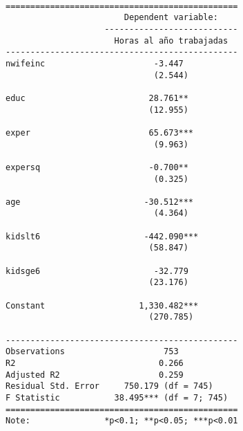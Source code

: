 \documentclass[
  letterpaper,
  DIV=11,
  numbers=noendperiod]{scrreprt}
\newenvironment{Shaded}{\begin{snugshade}}{\end{snugshade}}
\newcommand{\CommentTok}[1]{\textcolor[rgb]{0.37,0.37,0.37}{#1}}
\newcommand{\FunctionTok}[1]{\textcolor[rgb]{0.28,0.35,0.67}{#1}}
\newcommand{\NormalTok}[1]{\textcolor[rgb]{0.00,0.23,0.31}{#1}}
\newcommand{\SpecialCharTok}[1]{\textcolor[rgb]{0.37,0.37,0.37}{#1}}
\begin{document}
\begin{verbatim}

===============================================
                        Dependent variable:    
                    ---------------------------
                      Horas al año trabajadas  
-----------------------------------------------
nwifeinc                      -3.447           
                              (2.544)          
                                               
educ                         28.761**          
                             (12.955)          
                                               
exper                        65.673***         
                              (9.963)          
                                               
expersq                      -0.700**          
                              (0.325)          
                                               
age                         -30.512***         
                              (4.364)          
                                               
kidslt6                     -442.090***        
                             (58.847)          
                                               
kidsge6                       -32.779          
                             (23.176)          
                                               
Constant                   1,330.482***        
                             (270.785)         
                                               
-----------------------------------------------
Observations                    753            
R2                             0.266           
Adjusted R2                    0.259           
Residual Std. Error     750.179 (df = 745)     
F Statistic           38.495*** (df = 7; 745)  
===============================================
Note:               *p<0.1; **p<0.05; ***p<0.01
\end{verbatim}

\begin{Shaded}
\end{Shaded}
\end{document}
